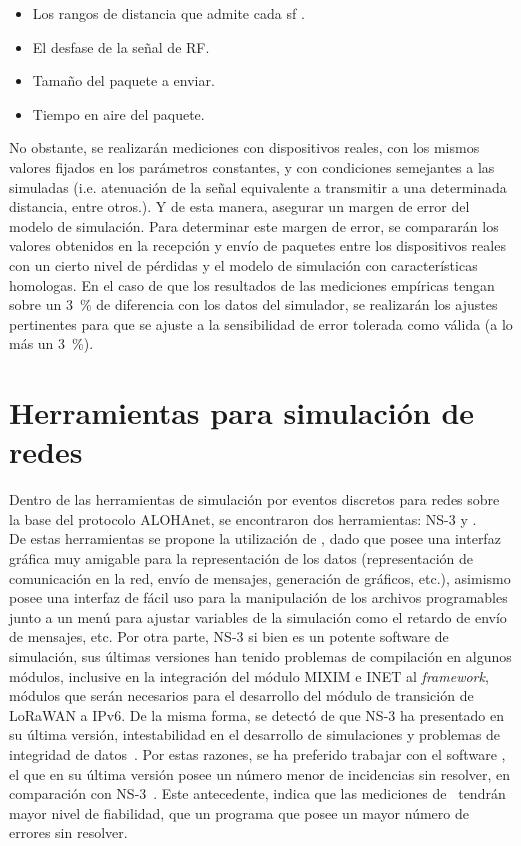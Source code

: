 \begin{justify}
\begin{itemize}
\item Los rangos de distancia que admite cada \gls{sf} .
\item El desfase de la señal de RF.
\item Tamaño del paquete a enviar.
\item Tiempo en aire del paquete.
\end{itemize}
No obstante, se realizarán mediciones con dispositivos reales, con los mismos valores fijados en los parámetros constantes, y con condiciones semejantes a las simuladas (i.e. atenuación de la señal equivalente a transmitir a una determinada distancia, entre otros.). Y de esta manera, asegurar un margen de error del modelo de simulación. Para determinar este margen de error, se compararán los valores obtenidos en la recepción y envío de paquetes entre los dispositivos reales con un cierto nivel de pérdidas y el modelo de simulación con características homologas. En el caso de que los resultados de las mediciones empíricas tengan sobre un \SI{3}{\percent} de diferencia con los datos del simulador, se realizarán los ajustes pertinentes para que se ajuste a la sensibilidad de error tolerada como válida (a lo más un \SI{3}{\percent}).
\section{Herramientas para simulación de redes}
Dentro de las herramientas de simulación por eventos discretos para redes sobre la base del protocolo ALOHAnet, se encontraron dos herramientas: NS-3 y \OMNET.\\
De estas herramientas se propone la utilización de \OMNET, dado que posee una interfaz gráfica muy amigable para la representación de los datos (representación de comunicación en la red, envío de mensajes, generación de gráficos, etc.), asimismo posee una interfaz de fácil uso para la manipulación de los archivos programables junto a un menú para ajustar variables de la simulación como el retardo de envío de mensajes, etc. Por otra parte, NS-3 si bien es un potente software de simulación, sus últimas versiones han tenido problemas de compilación en algunos módulos, inclusive en la integración del módulo MIXIM e INET al \textit{framework}, módulos que serán necesarios para el desarrollo del módulo de transición de LoRaWAN a IPv6. De la misma forma, se detectó de que NS-3 ha presentado en su última versión, intestabilidad en el desarrollo de simulaciones y problemas de integridad de datos~\cite{bugtrack}. Por estas razones, se ha preferido trabajar con el software \OMNET, el que en su última versión posee un número menor de incidencias sin resolver, en comparación con NS-3~\cite{bugtrack2}. Este antecedente, indica que las mediciones de \OMNET~tendrán mayor nivel de fiabilidad, que un programa que posee un mayor número de errores sin resolver.

\end{justify}
